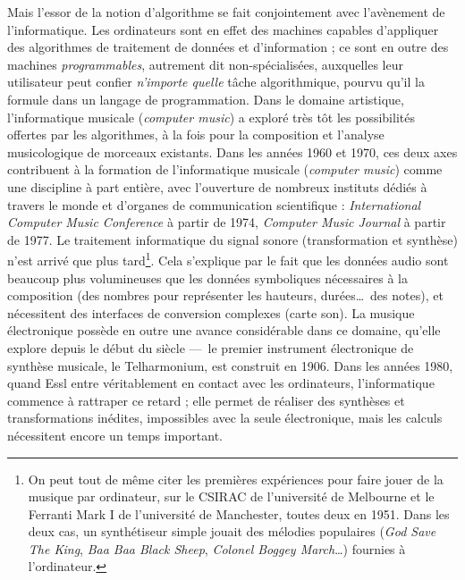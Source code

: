 \documentclass[a4paper,12pt]{article}
\begin{document}
Mais l'essor de la notion d'algorithme se fait conjointement avec l'avènement de l'informatique. Les ordinateurs sont en effet des machines capables d'appliquer des algorithmes de traitement de données et d'information ; ce sont en outre des machines \emph{programmables}, autrement dit non-spécialisées, auxquelles leur utilisateur peut confier \emph{n'importe quelle} tâche algorithmique, pourvu qu'il la formule dans un langage de programmation. Dans le domaine artistique, l'informatique musicale (\emph{computer music}) a exploré très tôt les possibilités offertes par les algorithmes, à la fois pour la composition et l'analyse musicologique de morceaux existants. Dans les années 1960 et 1970, ces deux axes contribuent à la formation de l'informatique musicale (\emph{computer music}) comme une discipline à part entière, avec l'ouverture de nombreux instituts dédiés à travers le monde et d'organes de communication scientifique : \emph{International Computer Music Conference} à partir de 1974, \emph{Computer Music Journal} à partir de 1977. Le traitement informatique du signal sonore (transformation et synthèse) n'est arrivé que plus tard\footnote{On peut tout de même citer les premières expériences pour faire jouer de la musique par ordinateur, sur le CSIRAC de l'université de Melbourne et le Ferranti Mark I de l'université de Manchester, toutes deux en 1951. Dans les deux cas, un synthétiseur simple jouait des mélodies populaires (\emph{God Save The King}, \emph{Baa Baa Black Sheep}, \emph{Colonel Boggey March}\dots) fournies à l'ordinateur.}. Cela s'explique par le fait que les données audio sont beaucoup plus volumineuses que les données symboliques nécessaires à la composition (des nombres pour représenter les hauteurs, durées\dots~des notes), et nécessitent des interfaces de conversion complexes (carte son). La musique électronique possède en outre une avance considérable dans ce domaine, qu'elle explore depuis le début du siècle ---~le premier instrument électronique de synthèse musicale, le Telharmonium, est construit en 1906. Dans les années 1980, quand Essl entre véritablement en contact avec les ordinateurs, l'informatique commence à rattraper ce retard ; elle permet de réaliser des synthèses et transformations inédites, impossibles avec la seule électronique, mais les calculs nécessitent encore un temps important. \\
\end{document}
